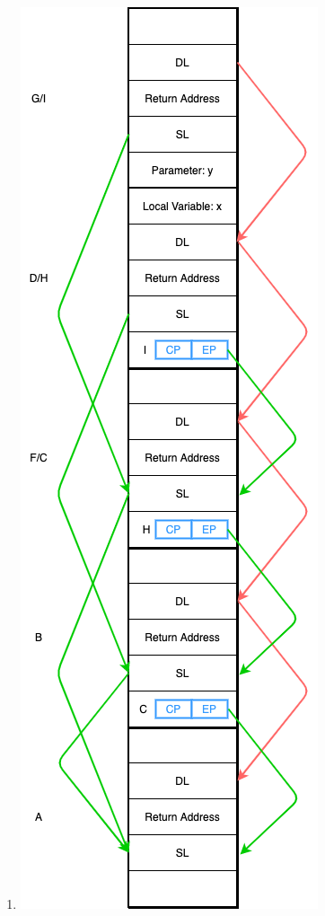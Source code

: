 \documentclass[a4paper,11pt]{article} %
\begin{document}
\begin{enumerate}
\begin{enumerate}
\begin{lstlisting}
    void B() {
      x = 1;
    }

    void C() {
      int x;  // dynamic scoping will update this x
      B();
    }

    C();
  }
\end{lstlisting}

    \item %
    \begin{itemize}
      \item Compile-time: to find the declaration of a variable in a statically
      scoped language, if we can find the declaration locally, then we use it;
      otherwise, it is a non-local variable, so we have to look at the scope in
      the same level of the definition of the function/procedure.
      \item Run time: we can find the reference of a variable by traversing the
      static link for pre-computed jumps in languages that support nested procedures.
    \end{itemize}

    \item %
    To find the declaration of a variable in a dynamically scoped language,
    if we can find the declaration locally, then we use it; otherwise, is a
    non-local variable so we have to look at the scope in the same level of the
    calling of the function/procedure by traversing the dynamic link and
    checking each stack frame until we find the variable.

  \end{enumerate}

  \item %
  \phantom{}

  \begin{minipage}[t]{\linewidth}
    \begin{center}
      \includegraphics[width=0.25\linewidth]{./images/4.png}
    \end{center}
  \end{minipage}


\end{enumerate}
\end{document}
